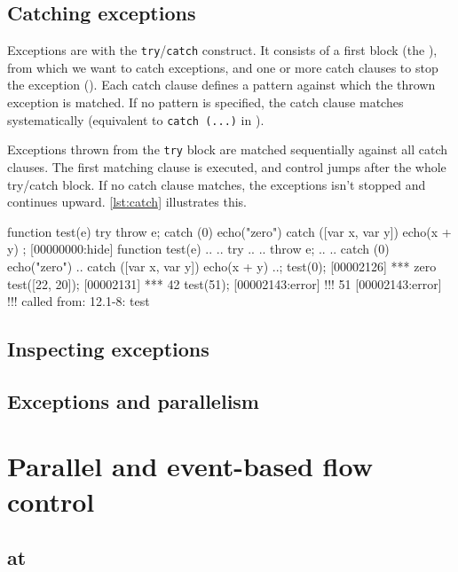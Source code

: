 \subsection{Catching exceptions}

Exceptions are  with the
\lstinline|try|/\lstinline|catch| construct. It consists of a first
block (the ), from which we want to catch exceptions,
and one or more catch clauses to stop the exception
(). Each catch clause defines a pattern against
which the thrown exception is matched. If no pattern is specified, the
catch clause matches systematically (equivalent to
\lstinline|catch (...)| in \Cxx).

Exceptions thrown from the \texttt{try} block are matched sequentially
against all catch clauses. The first matching clause is executed, and
control jumps after the whole try/catch block. If no catch clause
matches, the exceptions isn't stopped and continues
upward. \autoref{lst:catch} illustrates this.

\begin{urbiscript}[caption=Catching exceptions, label=lst:catch,
  float=\floatpos]
function test(e)
{
  try
  { throw e;  }
  catch (0)
  { echo("zero") }
  catch ([var x, var y])
  { echo(x + y) }
};
[00000000:hide] function test(e)
..{
..  try
..  {
..    throw e;
..  }
..  catch (0) { echo("zero") }
..  catch ([var x, var y]) { echo(x + y) }
..};
test(0);
[00002126] *** zero
test([22, 20]);
[00002131] *** 42
test(51);
[00002143:error] !!! 51
[00002143:error] !!!    called from: 12.1-8: test

\end{urbiscript}

\subsection{Inspecting exceptions}

\subsection{Exceptions and parallelism}



\FloatBarrier
\section{Parallel and event-based flow control}

\subsection{at}
